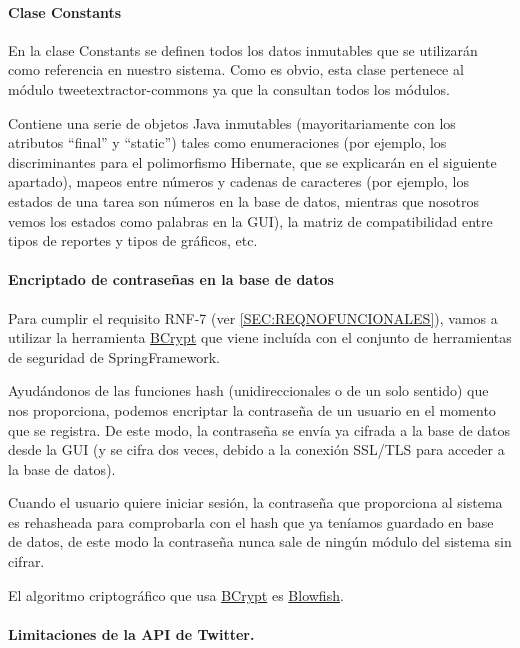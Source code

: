 \paragraph{Clase Constants}
En la clase Constants se definen todos los datos inmutables que se utilizarán como referencia en nuestro sistema. Como es obvio, esta clase pertenece al módulo tweetextractor-commons ya que la consultan todos los módulos.

Contiene una serie de objetos Java inmutables (mayoritariamente con los atributos ``final'' y ``static'') tales como enumeraciones (por ejemplo, los discriminantes para el polimorfismo Hibernate, que se explicarán en el siguiente apartado), mapeos entre números y cadenas de caracteres (por ejemplo, los estados de una tarea son números en la base de datos, mientras que nosotros vemos los estados como palabras en la GUI), la matriz de compatibilidad entre tipos de reportes y tipos de gráficos, etc.

\paragraph{Encriptado de contraseñas en la base de datos}
Para cumplir el requisito RNF-7 (ver \ref{SEC:REQNOFUNCIONALES}), vamos a utilizar la herramienta \href{https://docs.spring.io/spring-security/site/docs/current/api/org/springframework/security/crypto/bcrypt/BCrypt.html}{BCrypt} que viene incluída con el conjunto de herramientas de seguridad de SpringFramework. 

Ayudándonos de las funciones hash (unidireccionales o de un solo sentido) que nos proporciona, podemos encriptar la contraseña de un usuario en el momento que se registra. De este modo, la contraseña se envía ya cifrada a la base de datos desde la GUI (y se cifra dos veces, debido a la conexión SSL/TLS para acceder a la base de datos). 

Cuando el usuario quiere iniciar sesión, la contraseña que proporciona al sistema es rehasheada para comprobarla con el hash que ya teníamos guardado en base de datos, de este modo la contraseña nunca sale de ningún módulo del sistema sin cifrar.

El algoritmo criptográfico que usa \href{https://docs.spring.io/spring-security/site/docs/current/api/org/springframework/security/crypto/bcrypt/BCrypt.html}{BCrypt} es \href{https://en.wikipedia.org/wiki/Blowfish_(cipher)}{Blowfish}. 

\paragraph{Limitaciones de la API de Twitter.}

